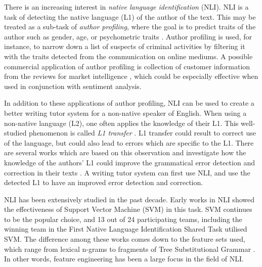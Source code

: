 There is an increasing interest in \emph{native language identification} (NLI).
NLI is a task of detecting the native language (L1) of the author of the text.
This may be treated as a sub-task of \emph{author profiling}, where the goal is to predict traits of the author such as gender, age, or psychometric traits  \citep{estival2007author}.
Author profiling is used, for instance, to narrow down a list of suspects of criminal activities \citep{abbasi2005applying} by filtering it with the traits detected from the communication on online mediums.
A possible commercial application of author profiling is collection of customer information from the reviews for market intelligence \citep{glance2005deriving}, which could be especially effective when used in conjunction with sentiment analysis.

In addition to these applications of author profiling, NLI can be used to create a better writing tutor system for a non-native speaker of English.
When using a non-native language (L2), one often applies the knowledge of their L1.
This well-studied phenomenon is called \emph{L1 transfer} \citep{wanner1982language, frenck1997syntactic, dussias2003syntactic, nitschke2010first}.
L1 transfer could result to correct use of the language, but could also lead to errors which are specific to the L1.
There are several works which are based on this observation and investigate how the knowledge of the authors' L1 could improve the grammatical error detection and correction in their texts \citep{chang2008automatic, rozovskaya2010generating, rozovskaya2011algorithm, dahlmeier2011correcting}.
A writing tutor system can first use NLI, and use the detected L1 to have an improved error detection and correction.

NLI has been extensively studied in the past decade.
Early works in NLI \citep{koppel2005determining, tsur2007using} showed the effectiveness of Support Vector Machine (SVM) in this task.
SVM continues to be the popular choice, and 13 out of 24 participating teams, including the winning team  \citep{jarvis2013maximizing} in the First Native Language Identification Shared Task  \citep{tetreault2013report} utilised SVM.
The difference among these works comes down to the feature sets used, which range from lexical n-grams \citep{koppel2005determining, tsur2007using, jarvis2013maximizing} to fragments of Tree Substitutional Grammar  \citep{swanson2012native}.
In other words, feature engineering has been a large focus in the field of NLI.


